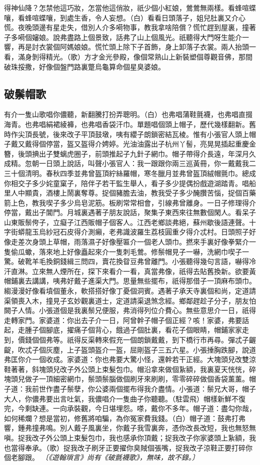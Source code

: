 得神仙降？怎禁他這巧妝，怎當他這俏妝，祇少個小紅娘，鶯鶯無兩樣。看蜂喧蝶嚷，看蜂喧蝶嚷，到處生香，令人妄想。（白）看看日頭落子，姐兒肚裏又介心慌。夜晚頭邊有星走失，借別人介多嗬物事，教我拿啥陪償？慌忙趕到屋裏，撞著子多嗬個嬸娘。說弗盡路上個景致，話弗了山上個風光。祇聽得大門呀生能介一響，再是討衣裳個阿媽娘娘。慌忙頭上除下子首飾，身上卸落子衣裳。兩人抬頭一看，滿身剝得精光。（歌）方才金光參殿，像個常熟山上新裝塑個尊觀音佛，那間破珠挼撒，好像個盤門路裏蹩烏龜算命個星臭婆娘。

\subsection*{破鬃帽歌}

有介一隻山歌唱你儂聽，新翻騰打扮弄聰明。（白）也弗唱蒲鞋氈襪，也弗唱直掇海青。也弗唱絹裙綾褲，也弗唱香袋汗巾。單題唱個頭上帽子，歷代幾樣翻新。舊時作尖頂長號，後來改子平頂鼓墩，咦有纓子朗鎖密結瓦棱。惟有小張官人頭上帽子戴又戴得個停當，盔又盔得介娉婷。光油油露出子杭州丫髻，亮晃晃插起重慶金簪，後頭捵出子雙螭虎圈子，前頭推起子九針子網巾。帽子帶得介長遠，年深月久成精。忽朝一日頭上說話，叫聲小張官人：我一跟跟你兩三巡黃冊，你一戴戴我二三十個清明。春秋四季並弗曾盔頂紵絲羅帽，寒冬臘月並弗曾盔頂絨帽氈巾。總成你相交子多少姹童窠子，陪伴子若干監生舉人，看子多少提偶扮戲遊湖踏青。唱船里人中顯貴，酒樓上鬧裏奪尊。捉個豬膽去油，教我受子多少醃臢苦惱，捉個百藥箭上色，教我喫子多少烏皂泥筋。板刷常常相會，引線弗曾離身。一日子修理得介停當，戴出子閶門。月城裏遇著子朋友說話，聚集子東西來往無數個閑人。看呆子山東販鬃侉子，立癡子江西販帽子個客人。江西老鄉談弗絕，蘇州歇後語連聲。十字街蟒龍玉烏紗冠石皮得介測癩，老弗識波羅生荔枝圓重夕得介忒村。日頭照子好像走差次身頭上草帽，雨落濕子好像壓匾介一個老人頭巾。撚來手裏好像拳緊介一隻偷瓜蠍，落來地上好像矗起來介一隻刺毛鶯。修鬃帽見子一嚇，洗網巾喫子一驚。破靴羊毛換銅錢緝三問四，賣花換眢豆弗曾離門。小張聽得幾句言語，嚇得冷汗直淋。立來無人煙所在，探下來看介一看，真當弗像，祇得去貼舊換新。欲要黃帽鋪裏去講講，咦弗好戴子進渠大門。思量無些擺布，祇得那借子一頂麻布頭巾。縐漫漫好像看墳個董永，軟搭搭好像丁憂個洞賓。遇著子承天寺裏個和尚，定道請渠領喪入木，撞見子玄妙觀裏道士，定道請渠退煞念經。鄉鄰趕趁子分子，朋友怕闕子人情。小張道個是我裏鬃兄便服，弗消得列位介費心。無些意思介一日，祇得走轉家門。家婆道：你出去子介一日，阿曾幹子帽子個正經？咳！家婆，弗要話起，走腫子個腳底，擢痛子個背心，餓過子個肚裏，看花子個眼睛，帽鋪家家走到，價錢個個弗等。祇得反渠轉來假充一個朗鎖戴戴，到下橋行市再尋。彈忒子齷齪，吹忒子個灰塵，上子盔頭盔介一盔，屈剛盔子三五六星。小張捶胸跌腳，說道弗匡你介一個收成。家婆道：你也弗要大驚小怪，還幹若干正經。大塊頭兒改雙涼鞋著著，斜塊頭兒改子外公頭上束髮包巾。帽沿拿來做個紥額，我裏夏天恍恍，碎塊頭兒做子一頂細密網巾，鬃頭鬃腦做個刷牙來刷刷，零零碎碎做個香袋薰薰。帽子道：我前世作盡子鬃孽，你公婆兩個擺布得我介盡情。小張道：鬃兄大哥，帽子大人，你儂弗要出言吐氣，我儂唱介一隻曲子你聽聽。（駐雲飛）帽樣新鮮不復完，今剩缺連。一向承裝觀，今日堪埋怨。嗏，戴你不多年。帽子道：盡勾你哉，如何稀爛？想是當初，修舊將咱騙，為你冤家費我錢。（白）帽子道：鼓弗打弗響，鍾弗撞弗鳴。別人戴子風裏坐，你戴子我雪裏奔，憑你改長改短，我也無怒無嗔。捉我改子外公頭上束髮包巾，我也感承你頂戴；捉我改子你家婆頭上紥額，我也當得奉承。（歌）捉我改子刷牙正要擢你臭賊個張嘴，捉我改子涼鞋正要打碎你個老腳跟。
\textit{〔《遊翰瑣言》尚有《破氈襪歌》，無味，故不錄。〕}

